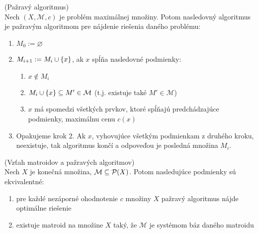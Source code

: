 \begin{definition}{(Pažravý algoritmus)}\\
Nech $(X, \mathcal{M}, c)$ je problém maximálnej množiny. Potom nasledovný algoritmus je pažravým algoritmom pre nájdenie riešenia
daného problému:
\begin{enumerate}
    \item $M_0 := \varnothing$
    \item $M_{i+1} := M_i \cup \left\{x\right\}$, ak $x$ spĺňa nasledovné podmienky:
    \begin{enumerate}
        \item $x \not\in M_i$
        \item $M_i \cup \left\{x\right\} \subseteq M' \in \mathcal{M}$ (t.j. existuje také $M' \in \mathcal{M}$)
        \item $x$ má spomedzi všetkých prvkov, ktoré spĺňajú predchádzajúce podmienky, maximálnu cenu $c(x)$
    \end{enumerate}
    \item Opakujeme krok 2. Ak $x$, vyhovujúce všetkým podmienkam z druhého kroku, neexistuje, tak algoritmus končí a odpoveďou je posledná množina $M_i$.
\end{enumerate}
\end{definition}

\begin{theorem}{(Vzťah matroidov a pažravých algoritmov)}\\
Nech $X$ je konečná množina, $\mathcal{M} \subseteq \mathcal{P}(X)$. Potom nasledujúce podmienky sú ekvivalentné:
\begin{enumerate}
    \item pre každé nezáporné ohodnotenie $c$ množiny $X$ pažravý algoritmus nájde optimálne riešenie
    \item existuje matroid na množine $X$ taký, že $\mathcal{M}$ je systémom báz daného matroidu 
\end{enumerate}
\end{theorem}
